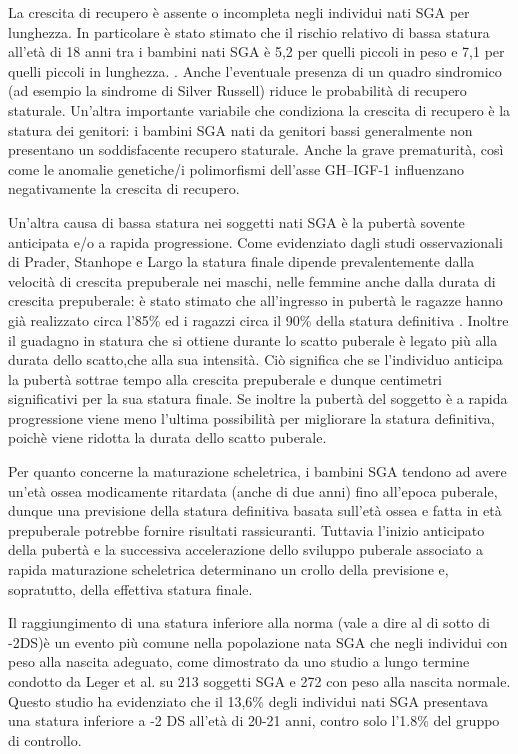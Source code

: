 La crescita di recupero è assente o incompleta negli individui nati SGA per lunghezza. In particolare è stato stimato che il rischio relativo di bassa statura all'età di 18 anni tra i bambini nati SGA è 5,2 per quelli 
piccoli in peso e 7,1 per quelli piccoli in lunghezza. \cite{cianfarani2006hormonal}. Anche l'eventuale presenza di un quadro sindromico (ad esempio la sindrome di Silver Russell) riduce le probabilità di recupero staturale. Un'altra importante variabile che condiziona la crescita di recupero è la statura dei genitori: i bambini SGA nati da genitori bassi generalmente non presentano un soddisfacente recupero staturale. Anche la grave prematurità, così come le anomalie genetiche/i polimorfismi dell'asse GH--IGF-1 influenzano negativamente la crescita di recupero. 


Un'altra causa di bassa statura nei soggetti nati SGA è la pubertà sovente anticipata e/o a rapida progressione\cite{albertsson2000children}.
Come evidenziato dagli studi osservazionali di Prader\cite{gasser1985human}, Stanhope\cite{stanhope1988new}
e Largo \cite{gasser2001growth} 
 la statura finale dipende prevalentemente dalla velocità di crescita prepuberale nei maschi, nelle femmine anche dalla durata di crescita prepuberale: è stato stimato che all'ingresso in pubertà le ragazze hanno già realizzato circa l'85\% ed i ragazzi circa il 90\% della statura definitiva . Inoltre il guadagno in statura che si ottiene durante lo scatto puberale è legato più alla durata dello scatto,che alla sua intensità. Ciò significa che se l'individuo anticipa la pubertà sottrae tempo alla crescita prepuberale e dunque centimetri significativi per la sua statura finale. Se inoltre la pubertà del soggetto è a rapida progressione viene meno l'ultima possibilità per migliorare la statura definitiva, poichè viene ridotta la durata dello scatto puberale.
 

Per quanto concerne la maturazione scheletrica, i bambini SGA tendono ad avere un'età ossea modicamente ritardata (anche di due anni) fino all'epoca puberale, dunque una previsione della statura definitiva basata sull'età ossea e fatta in età prepuberale potrebbe fornire risultati rassicuranti. Tuttavia l'inizio anticipato della pubertà e la successiva accelerazione dello sviluppo puberale associato a rapida maturazione scheletrica determinano un crollo della previsione e, sopratutto, della effettiva statura finale\cite{job1986histoire}.

Il raggiungimento di una statura inferiore alla norma (vale a dire al di sotto di -2DS)è un evento più comune nella popolazione nata SGA che negli individui con peso alla nascita adeguato, come dimostrato da uno studio a lungo termine condotto da Leger et al. su 213 soggetti SGA e 272 con peso alla nascita normale. Questo studio ha evidenziato che il 
13,6\% degli individui nati SGA presentava una statura inferiore a -2 DS all'età di
20-21 anni, contro solo l'1.8\% del gruppo di controllo.\cite{leger1997reduced}

